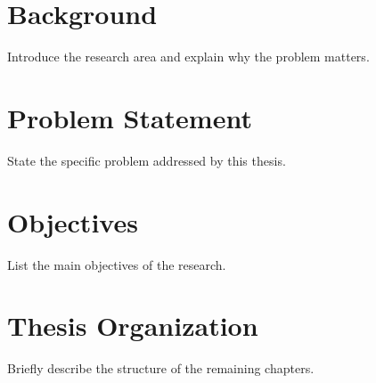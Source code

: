 \section{Background}

Introduce the research area and explain why the problem matters.

\section{Problem Statement}

State the specific problem addressed by this thesis.

\section{Objectives}

List the main objectives of the research.

\section{Thesis Organization}

Briefly describe the structure of the remaining chapters.
